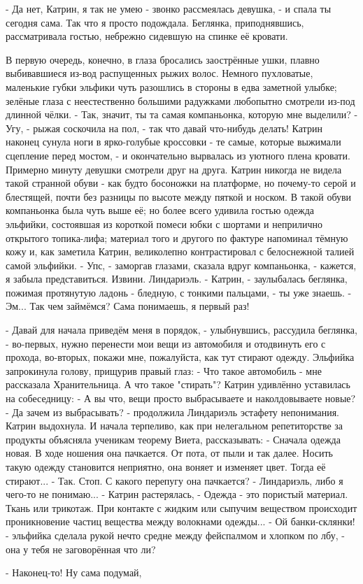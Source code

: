 

- Да нет, Катрин, я так не умею - звонко рассмеялась девушка, - и спала ты сегодня сама. Так что я просто подождала.
Беглянка, приподнявшись, рассматривала гостью, небрежно сидевшую на спинке её кровати.

В первую очередь, конечно, в глаза бросались заострённые ушки, плавно выбивавшиеся из-вод распущенных рыжих волос. Немного пухловатые, маленькие губки эльфики чуть разошлись в стороны в едва заметной улыбке; зелёные глаза с неестественно большими радужками любопытно смотрели из-под длинной чёлки.
 - Так, значит, ты та самая компаньонка, которую мне выделили?
 - Угу, - рыжая соскочила на пол, - так что давай что-нибудь делать!
Катрин наконец сунула ноги в ярко-голубые кроссовки - те самые, которые выжимали сцепление перед мостом, - и окончательно вырвалась из уютного плена кровати. Примерно минуту девушки смотрели друг на друга. Катрин никогда не видела такой странной обуви - как будто босоножки на платформе, но почему-то серой и блестящей, почти без разницы по высоте между пяткой и носком. В такой обуви компаньонка была чуть выше её; но более всего удивила гостью одежда эльфийки, состоявшая из короткой помеси юбки с шортами и неприлично открытого топика-лифа; материал того и другого по фактуре напоминал тёмную кожу и, как заметила Катрин, великолепно контрастировал с белоснежной талией самой эльфийки.
 - Упс, - заморгав глазами, сказала вдруг компаньонка, - кажется, я забыла представиться. Извини. Линдариэль.
 - Катрин, - заулыбалась беглянка, пожимая протянутую ладонь - бледную, с тонкими пальцами, - ты уже знаешь.
 - Эм... Так чем займёмся? Сама понимаешь, я первый раз!


 - Давай для начала приведём меня в порядок, - улыбнувшись, рассудила беглянка, - во-первых, нужно перенести мои вещи из автомобиля и отодвинуть его с прохода, во-вторых, покажи мне, пожалуйста, как тут стирают одежду.
Эльфийка запрокинула голову, прищурив правый глаз:
 - Что такое автомобиль - мне рассказала Хранительница. А что такое "стирать"?
Катрин удивлённо уставилась на собеседницу:
 - А вы что, вещи просто выбрасываете и наколдовываете новые?
 - Да зачем из выбрасывать? - продолжила Линдариэль эстафету непонимания.
Катрин выдохнула. И начала терпеливо, как при нелегальном репетиторстве за продукты объясняла ученикам теорему Виета, рассказывать:
 - Сначала одежда новая. В ходе ношения она пачкается. От пота, от пыли и так далее. Носить такую одежду становится неприятно, она воняет и изменяет цвет. Тогда её стирают...
 - Так. Стоп. С какого перепугу она пачкается?
 - Линдариэль, либо я чего-то не понимаю... - Катрин растерялась, - Одежда - это пористый материал. Ткань или трикотаж. При контакте с жидким или сыпучим веществом происходит проникновение частиц вещества между волокнами одежды...
 - Ой банки-склянки! - эльфийка сделала рукой нечто средне между фейспалмом и хлопком по лбу, - она у тебя не заговорённая что ли?

 - Наконец-то! Ну сама подумай,
